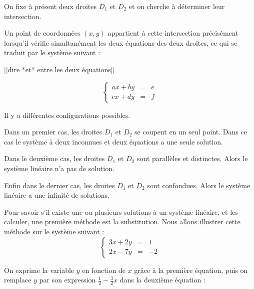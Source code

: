 On fixe à présent deux droites \(D_1\) et \(D_2\) et on cherche à déterminer leur intersection. 

\change

Un point de coordonnées \((x,y)\) appartient à cette intersection précisément 
lorsqu'il vérifie simultanément les deux équations des deux droites, 
ce qui se traduit par le système suivant :


[[dire *et* entre les deux équations]]

\begin{equation}
\left\{\begin{array}{rcl} 
a x + b y & = & e\\
c x + d y & = & f 
\end{array}\right.  
\tag{$S$}  
\label{eq:syslin1}  
\end{equation}



\diapo

Il y a différentes configurations possibles.

Dans un premier cas, 
les droites $D_1$ et $D_2$ se coupent en un seul point. 
Dans ce cas le système à deux inconnues et deux équations a une seule solution.


\change

Dans le deuxième cas, les droites $D_1$ et $D_2$ sont parallèles et distinctes. 
Alors le système linéaire n'a pas de solution. 


\change

Enfin dans le dernier cas, les droites $D_1$ et $D_2$ sont confondues. 
Alors le système linéaire a une infinité de solutions.  


\diapo

Pour savoir s'il existe une ou plusieurs solutions à un système linéaire, 
et les calculer, une première méthode est la substitution.
Nous allons illustrer cette méthode sur le système suivant :
\begin{equation}
\left\{\begin{array}{rcl} 
3 x + 2 y & = & 1\\
2 x - 7 y & = & -2 
\end{array}\right.   
\end{equation}


\change

On exprime la variable \(y\) en fonction de \(x\) grâce à la première équation, 
puis on remplace \(y\) par son expression \(\frac{1}{2}- \frac{3}{2}x \) 
dans la deuxième équation :

